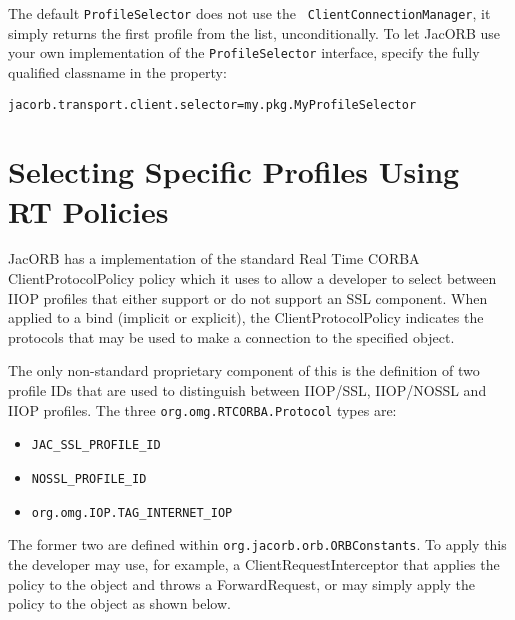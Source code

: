 The default {\tt ProfileSelector} does not use the {\tt
 ClientConnectionManager}, it simply returns the first profile from
 the list, unconditionally.  To let JacORB use your own implementation
 of the {\tt ProfileSelector} interface, specify the fully qualified
 classname in the property:

\begin{verbatim}
jacorb.transport.client.selector=my.pkg.MyProfileSelector
\end{verbatim}

\section{Selecting Specific Profiles Using RT Policies}
JacORB has a implementation of the standard Real Time CORBA ClientProtocolPolicy
policy which it uses to allow a developer to select between IIOP profiles that
either support or do not support an SSL component. When applied to a bind
(implicit or explicit), the ClientProtocolPolicy indicates the protocols that
 may be used to make a connection to the specified object.

The only non-standard proprietary component of this is the definition of two profile
IDs that are used to distinguish between IIOP/SSL, IIOP/NOSSL and IIOP profiles. The
three {\tt org.omg.RTCORBA.Protocol} types are:

\begin{itemize}
\item {\tt JAC\_SSL\_PROFILE\_ID}
\item {\tt NOSSL\_PROFILE\_ID}
\item {\tt org.omg.IOP.TAG\_INTERNET\_IOP}
\end {itemize}

The former two are defined within {\tt org.jacorb.orb.ORBConstants}. To apply
this the developer may use, for example, a ClientRequestInterceptor that applies
the policy to the object and throws a ForwardRequest, or may simply apply the
policy to the object as shown below.

